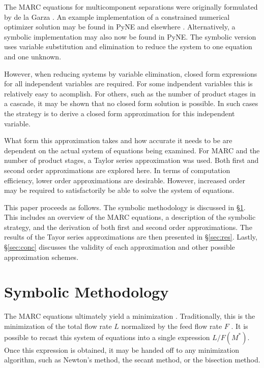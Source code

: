 \documentclass{ansconf}
\begin{document}
The MARC equations for multicomponent separations were originally formulated 
by de la Garza \cite{DelaGarza1969}.
An example implementation of a constrained numerical optimizer solution may be 
found in PyNE and elsewhere \cite{pyne:enrichment,doi:10.1080/01496391003793884}.  
Alternatively, a symbolic implementation may also now be found in PyNE.  The symbolic
version uses variable substitution and elimination to reduce the system to one 
equation and one unknown.

However, when reducing systems by variable elimination, closed form expressions for 
all independent variables are required.  For some indpendent variables this is 
relatively easy to acomplish. For others, such as the number of product stages in
a cascade, it may be shown that no closed form solution is possible.  In such cases 
the strategy is to derive a closed form approximation for this independent variable.

What form this approximation takes and how accurate it needs to be are dependent on 
the actual system of equations being examined.  For MARC and the number of product
stages, a Taylor series approximation was used.  Both first and second order 
approximations are explored here.  In terms of computation efficiency, lower order 
approximations are desirable.  However, increased order may be required to 
satisfactorily be able to solve the system of equations.

This paper proceeds as follows.  The symbolic methodology 
is discussed in \S\ref{sec:meth}.  This includes an overview of the
MARC equations, a description of the symbolic strategy, and the
derivation of both first and second order approximations.
The results of the Tayor series approximations are then presented in \S\ref{sec:res}. 
Lastly, \S\ref{sec:conc} discusses the validity of each approximation and other
possible approximation schemes.

\section{Symbolic Methodology}
\label{sec:meth}
The MARC equations ultimately yield a minimization \cite{Wood1999}.  Traditionally, 
this is the minimization of the total flow rate $L$ normalized by the feed flow rate 
$F$ \cite{DelaGarza1969}.  It is possible to recast this system of equations 
into a single expression $L/F(M^*)$.  Once this expression is obtained, it 
may be handed off to any minimization algorithm, such as Newton's
method, the secant method, or the bisection method.  
\end{document}
